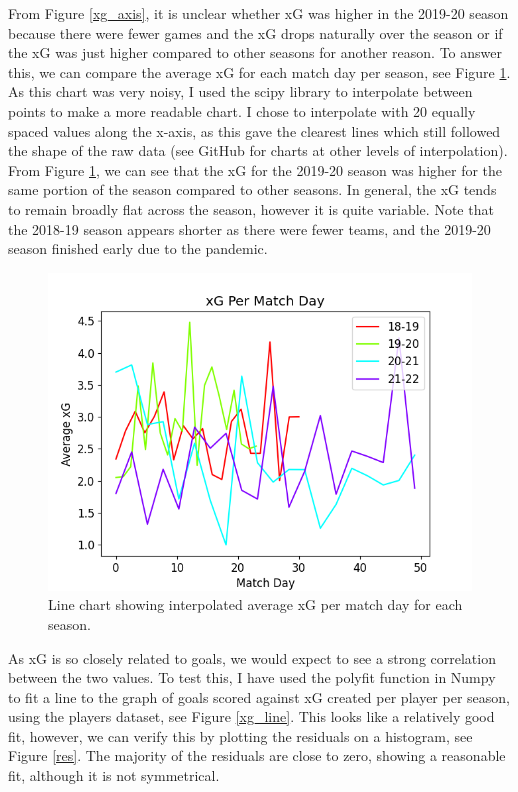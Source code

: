\documentclass[12pt, a4paper, twocolumn]{article}
\begin{document}
From Figure \ref{xg_axis}, it is unclear whether xG was higher in the 2019-20 season because there were fewer games and the xG drops naturally over the season or if the xG was just higher compared to other seasons for another reason. To answer this, we can compare the average xG for each match day per season, see Figure \ref{xg_match}. As this chart was very noisy, I used the scipy library to interpolate between points to make a more readable chart. I chose to interpolate with 20 equally spaced values along the x-axis, as this gave the clearest lines which still followed the shape of the raw data (see GitHub\cite{git} for charts at other levels of interpolation). From Figure \ref{xg_match}, we can see that the xG for the 2019-20 season was higher for the same portion of the season compared to other seasons. In general, the xG tends to remain broadly flat across the season, however it is quite variable. Note that the 2018-19 season appears shorter as there were fewer teams, and the 2019-20 season finished early due to the pandemic.

\begin{figure}
  \includegraphics[width=\linewidth]{../vis/fixtures/xg_matchday20.png}
  \caption{Line chart showing interpolated average xG per match day for each season.}
  \label{xg_match}
\end{figure}

As xG is so closely related to goals, we would expect to see a strong correlation between the two values. To test this, I have used the polyfit function in Numpy to fit a line to the graph of goals scored against xG created per player per season, using the players dataset, see Figure \ref{xg_line}. This looks like a relatively good fit, however, we can verify this by plotting the residuals on a histogram, see Figure \ref{res}. The majority of the residuals are close to zero, showing a reasonable fit, although it is not symmetrical.
\end{document}
